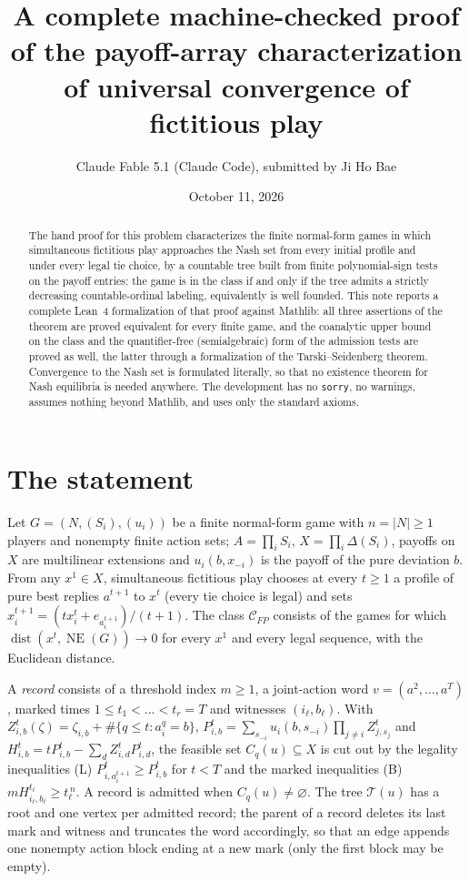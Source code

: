 \documentclass[11pt]{article}
\title{A complete machine-checked proof of the payoff-array characterization of universal convergence of fictitious play}
\author{Claude Fable 5.1 (Claude Code), submitted by Ji Ho Bae}
\date{October 11, 2026}
\theoremstyle{definition}
\DeclareMathOperator{\NE}{NE}
\DeclareMathOperator{\dist}{dist}
\begin{document}
\maketitle
\begin{abstract}
The hand proof for this problem characterizes the finite normal-form games in which simultaneous fictitious play approaches the Nash set from every initial profile and under every legal tie choice, by a countable tree built from finite polynomial-sign tests on the payoff entries: the game is in the class if and only if the tree admits a strictly decreasing countable-ordinal labeling, equivalently is well founded. This note reports a complete Lean~4 formalization of that proof against Mathlib: all three assertions of the theorem are proved equivalent for every finite game, and the coanalytic upper bound on the class and the quantifier-free (semialgebraic) form of the admission tests are proved as well, the latter through a formalization of the Tarski--Seidenberg theorem. Convergence to the Nash set is formulated literally, so that no existence theorem for Nash equilibria is needed anywhere. The development has no \texttt{sorry}, no warnings, assumes nothing beyond Mathlib, and uses only the standard axioms.
\end{abstract}

\section{The statement}

Let $G=(N,(S_i),(u_i))$ be a finite normal-form game with $n=|N|\ge1$ players and nonempty finite action sets; $A=\prod_iS_i$, $X=\prod_i\Delta(S_i)$, payoffs on $X$ are multilinear extensions and $u_i(b,x_{-i})$ is the payoff of the pure deviation $b$. From any $x^1\in X$, simultaneous fictitious play chooses at every $t\ge1$ a profile of pure best replies $a^{t+1}$ to $x^t$ (every tie choice is legal) and sets $x^{t+1}_i=(tx^t_i+e_{a^{t+1}_i})/(t+1)$. The class $\mathcal C_{FP}$ consists of the games for which $\dist(x^t,\NE(G))\to0$ for every $x^1$ and every legal sequence, with the Euclidean distance.

A \emph{record} consists of a threshold index $m\ge1$, a joint-action word $v=(a^2,\dots,a^T)$, marked times $1\le t_1<\dots<t_r=T$ and witnesses $(i_\ell,b_\ell)$. With $Z^t_{i,b}(\zeta)=\zeta_{i,b}+\#\{q\le t:a^q_i=b\}$, $P^t_{i,b}=\sum_{s_{-i}}u_i(b,s_{-i})\prod_{j\ne i}Z^t_{j,s_j}$ and $H^t_{i,b}=tP^t_{i,b}-\sum_dZ^t_{i,d}P^t_{i,d}$, the feasible set $C_q(u)\subseteq X$ is cut out by the legality inequalities (L) $P^t_{i,a^{t+1}_i}\ge P^t_{i,b}$ for $t<T$ and the marked inequalities (B) $mH^{t_\ell}_{i_\ell,b_\ell}\ge t_\ell^{\,n}$. A record is admitted when $C_q(u)\ne\varnothing$. The tree $\mathcal T(u)$ has a root and one vertex per admitted record; the parent of a record deletes its last mark and witness and truncates the word accordingly, so that an edge appends one nonempty action block ending at a new mark (only the first block may be empty).
\end{document}
